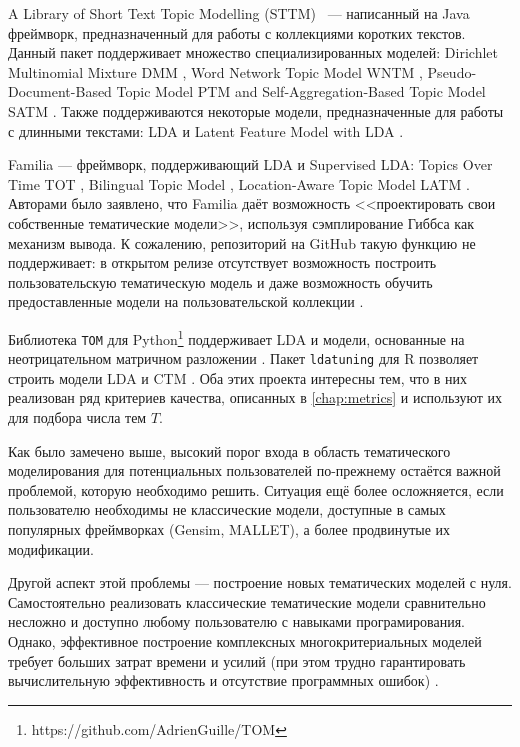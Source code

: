 A Library of Short Text Topic Modelling (STTM) \cite{qiang2018sttm} ~--- написанный на Java фреймворк, предназначенный для работы с коллекциями коротких текстов. Данный пакет поддерживает множество специализированных моделей: Dirichlet Multinomial Mixture DMM \cite{yin2014dirichlet}, Word Network Topic Model WNTM \cite{zuo2016word}, Pseudo-Document-Based Topic Model PTM \cite{zuo2016topic} and Self-Aggregation-Based Topic Model SATM \cite{quan2015short}. Также поддерживаются некоторые модели, предназначенные для работы с длинными текстами: LDA и Latent Feature Model with LDA \cite{nguyen2015improving}.

Familia \cite{jiang2018familia} --- фреймворк, поддерживающий LDA и Supervised LDA: Topics Over Time TOT \cite{wang2006topics}, Bilingual Topic Model \cite{gao2011clickthrough}, Location-Aware Topic Model LATM \cite{wang2007mining}. Авторами было заявлено, что Familia даёт возможность <<проектировать свои собственные тематические модели>>, используя сэмплирование Гиббса как механизм вывода. К сожалению, репозиторий на GitHub такую функцию не поддерживает: в открытом релизе отсутствует возможность построить пользовательскую тематическую модель и даже возможность обучить предоставленные модели на пользовательской коллекции \cite{familia_github}.

Библиотека \texttt{TOM} для Python\footnote{ https://github.com/AdrienGuille/TOM} поддерживает LDA и модели, основанные на неотрицательном матричном разложении \cite{guille2016tom}. Пакет \texttt{ldatuning} для R позволяет строить модели LDA и CTM \cite{ldatuning}. Оба этих проекта интересны тем, что в них реализован ряд критериев качества, описанных в \ref{chap:metrics} и используют их для подбора числа тем $T$.

Как было замечено выше, высокий порог входа в область тематического моделирования для потенциальных пользователей по-прежнему остаётся важной проблемой, которую необходимо решить. Ситуация ещё более осложняется, если пользователю необходимы не классические модели, доступные в самых популярных фреймворках (Gensim, MALLET), а более продвинутые их модификации.

Другой аспект этой проблемы --- построение новых тематических моделей с нуля. Самостоятельно реализовать классические тематические модели сравнительно несложно и доступно любому пользователю с навыками програмирования. Однако, эффективное построение комплексных многокритериальных моделей требует больших затрат времени и усилий (при этом трудно гарантировать вычислительную эффективность и отсутствие программных ошибок) \cite{jiang2018familia}.

